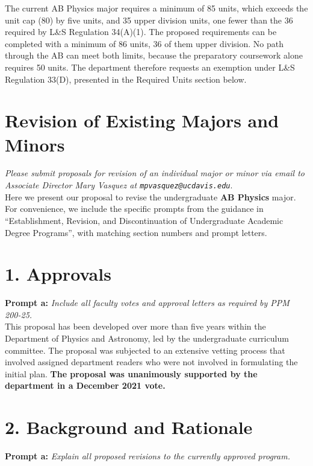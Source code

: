 \documentclass[12pt]{article}
\begin{document}
\noindent
The current AB Physics major requires a minimum of 85 units, which
exceeds the unit cap (80) by five units, and 35 upper division units,
one fewer than the 36 required by L\&S Regulation 34(A)(1).  The
proposed requirements can be completed with a minimum of 86 units, 36
of them upper division.  No path through the AB can meet both
limits, because the preparatory coursework alone requires 50 units.
The department therefore requests an exemption under L\&S Regulation
33(D), presented in the Required Units section below.

\newpage

\section*{Revision of Existing Majors and Minors}
{\it Please submit proposals for revision of an individual major or minor via email to Associate Director Mary Vasquez at \texttt{mpvasquez@ucdavis.edu}}.\\[5pt]

\noindent
Here we present our proposal to revise the undergraduate {\bf AB
  Physics} major.  For convenience, we include the specific prompts
from the guidance in ``Establishment, Revision, and Discontinuation of
Undergraduate Academic Degree Programs'', with matching section
numbers and prompt letters.

\section*{1. Approvals}

\noindent
{\bf Prompt a:} {\it Include all faculty votes and approval letters as required by PPM 200-25.}\\[5pt]

\noindent
This proposal has been developed over more than five years within the
Department of Physics and Astronomy, led by the undergraduate
curriculum committee.  The proposal was subjected to an extensive
vetting process that involved assigned department readers who were not
involved in formulating the initial plan.  {\bf The proposal was
unanimously supported by the department in a December 2021 vote.}

\section*{2. Background and Rationale}

\noindent
{\bf Prompt a:} {\it Explain all proposed revisions to the currently approved program.}\\[5pt]
\end{document}
